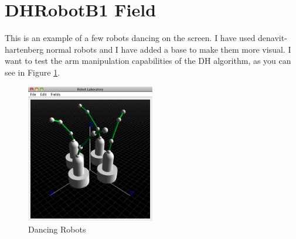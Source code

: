 \documentclass[12pt,a4paper,oneside,english]{book}
\begin{document}
\section{DHRobotB1 Field}

This is an example of a few robots dancing on the screen. I have used denavit-hartenberg normal robots and I have added a base to make them more visual. I want to test the arm manipulation capabilities of the DH algorithm, as you can see in Figure \ref{dancing dobots}.

\begin{figure}[htbp]
  \begin{center}
    \includegraphics[width=0.5\textwidth]{images/DR.png}
    \caption{Dancing Robots}
    \label{dancing dobots}
  \end{center}
\end{figure}
\end{document}
